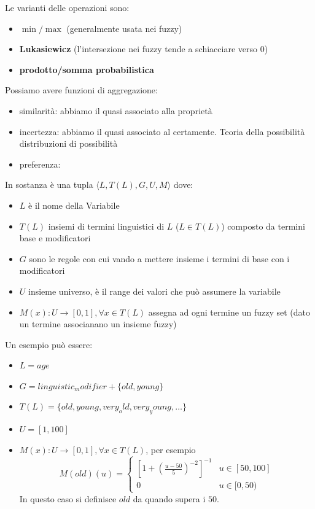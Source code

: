 \begin{esempio}
    Le varianti delle operazioni sono:
    \begin{itemize}
        \item $\min/\max$ (generalmente usata nei fuzzy)
        \item \textbf{Lukasiewicz} (l'intersezione nei fuzzy tende a schiacciare verso 0)
        \item \textbf{prodotto/somma probabilistica}
    \end{itemize}
\end{esempio}

Possiamo avere funzioni di aggregazione:
\begin{itemize}
    \item similarità: abbiamo il quasi associato alla proprietà
    \item incertezza: abbiamo il quasi associato al certamente. Teoria della possibilità 
    distribuzioni di possibilità
    \item preferenza:
\end{itemize}


\begin{definizione}
    In sostanza è una tupla $\langle L, T(L), G, U , M\rangle$ dove:
    \begin{itemize}
        \item $L$ è il nome della Variabile
        \item $T(L)$ insiemi di termini linguistici di $L$ ($L\in T(L)$) composto da 
        termini base e modificatori
        \item $G$ sono le regole con cui vando a mettere insieme i termini di base con i modificatori
        \item $U$ insieme universo, è il range dei valori che può assumere la variabile
        \item $M(x): U \to [0,1], \forall x\in T(L)$ assegna ad ogni termine un fuzzy set (dato un termine associanano un insieme fuzzy)
    \end{itemize} 
\end{definizione}

\begin{esempio}
    Un esempio può essere:
    \begin{itemize}
        \item $L=age$
        \item $G=linguistic_modifier+\{old, young\}$
        \item $T(L)=\{old,young, very_old,very_young, \dots\}$
        \item $U=[1,100]$
        \item $M(x):U\to [0,1], \forall x\in T(L)$, per esempio
        $$M(old)(u)=\begin{cases}
            \left[1+(\frac{u-50}{5})^{-2}\right]^{-1} & u\in [50,100]\\
            0 & u\in [0, 50)
        \end{cases}$$
        In questo caso si definisce $old$ da quando supera i $50$.
    \end{itemize}
\end{esempio}

